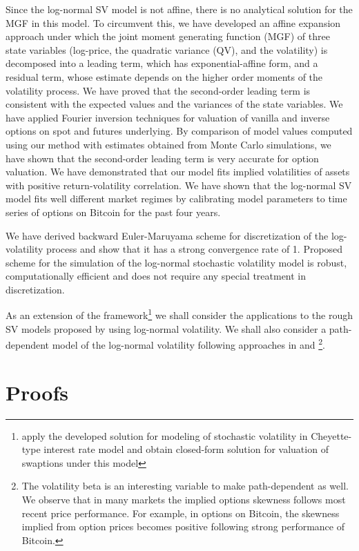 \documentclass[11pt,a4paper] {article}
\begin{document}
Since the log-normal SV model is not affine, there is no analytical solution for the MGF in this model. To circumvent this, we have developed an affine expansion approach under which the joint moment generating function (MGF) of three state variables (log-price, the quadratic variance (QV), and the volatility) is decomposed into a leading term, which has exponential-affine form, and a residual term, whose estimate depends on the higher order moments of the volatility process. We have proved that the second-order leading term is consistent with the expected values and the variances of the state variables. We have applied Fourier inversion techniques for valuation of vanilla and inverse options on spot and futures underlying. By comparison of model values computed using our method with estimates obtained from Monte Carlo simulations, we have shown that the second-order leading term is very accurate for option valuation. We have demonstrated that our model fits implied volatilities of assets with positive return-volatility correlation. We have shown that the log-normal SV model fits well different market regimes by calibrating model parameters to time series of options on Bitcoin for the past four years.

We have derived backward Euler-Maruyama scheme for discretization of the log-volatility process and show that it has a strong convergence rate of 1. Proposed scheme for the simulation of the log-normal stochastic volatility model is robust, computationally efficient and does not require any special treatment in discretization. 

As an extension of the framework\footnote{\cite{SeppRakhmonov2023a} apply the developed solution for modeling of stochastic volatility in Cheyette-type interest rate model and obtain closed-form solution for valuation of swaptions under this model} we shall consider the applications to the rough SV models proposed by \cite{Gatheral} using log-normal volatility. We shall also consider a path-dependent model of the log-normal volatility following approaches in \cite{Guyon2023} and \cite{Lipton2023}\footnote{The volatility beta is an interesting variable to make path-dependent as well. We observe that in many markets the implied options skewness follows most recent price performance. For example, in options on Bitcoin, the skewness implied from option prices becomes positive following strong performance of Bitcoin.}.




\appendix
\section{Proofs}\label{sec:appendix}
\end{document}

